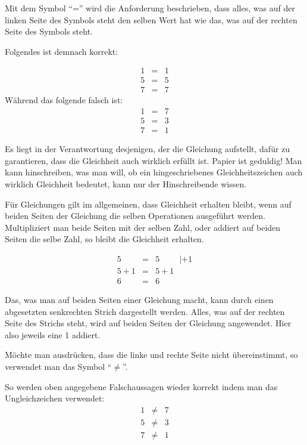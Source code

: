 \begin{definition}
Mit dem Symbol "`="' wird die Anforderung beschrieben, dass alles, was auf der linken Seite des Symbols steht den selben Wert hat wie das, was auf der rechten Seite des Symbols steht. 
\end{definition}
Folgendes ist demnach korrekt:

\begin{eqnarray*}
1 &=& 1 \\
5 &=& 5 \\
7 &=& 7
\end{eqnarray*}
Während das folgende falsch ist:
\begin{eqnarray*}
1 &=& 7 \\
5 &=& 3 \\
7 &=& 1
\end{eqnarray*}

Es liegt in der Verantwortung desjenigen, der die Gleichung aufstellt, dafür zu garantieren, dass die Gleichheit auch wirklich erfüllt ist. Papier ist geduldig! Man kann hinschreiben, was man will, ob ein hingeschriebenes Gleichheitszeichen auch wirklich Gleichheit bedeutet, kann nur der Hinschreibende wissen.

Für Gleichungen gilt im allgemeinen, dass Gleichheit erhalten bleibt, wenn auf beiden Seiten der Gleichung die selben Operationen ausgeführt werden. Multipliziert man beide Seiten mit der selben Zahl, oder addiert auf beiden Seiten die selbe Zahl, so bleibt die Gleichheit erhalten.

\begin{eqnarray*}
5 &=& 5  \hspace{1cm}| +1\\
5+1 &=& 5+1 \\
6 &=& 6
\end{eqnarray*}

Das, was man auf beiden Seiten einer Gleichung macht, kann durch einen abgesetzten senkrechten Strich dargestellt werden. Alles, was auf der rechten Seite des Strichs steht, wird auf beiden Seiten der Gleichung angewendet. Hier also jeweils eine 1 addiert.

\begin{definition}
Möchte man ausdrücken, dass die linke und rechte Seite nicht übereinstimmt, so verwendet man das Symbol "`$\neq $"'. 
\end{definition}
So werden oben angegebene Falschaussagen wieder korrekt indem man das Ungleichzeichen verwendet:
\begin{eqnarray*}
1 &\neq & 7 \\
5 &\neq & 3 \\
7 &\neq & 1
\end{eqnarray*}

